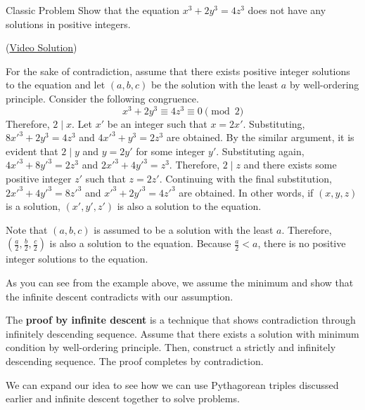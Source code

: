\documentclass[../../../main.tex]{subfiles}
\begin{document}
\begin{problem}{Classic Problem}{}
Show that the equation $x^3 + 2y^3 = 4z^3$ does not have any
solutions in positive integers.
\end{problem}
(\href{https://youtu.be/UJR56wT0NIM}{Video Solution})
\begin{solution}
For the sake of contradiction, assume that there exists positive
integer solutions to the equation and let $(a, b, c)$ be the
solution with the least $a$ by well-ordering principle.
Consider the following congruence.
\[
x^3 + 2y^3 \equiv 4z^3 \equiv 0 \pmod{2}
\]
Therefore, $2 \mid x$. Let $x'$ be an integer such that $x = 2x'$.
Substituting, $8x'^3 + 2y^3 = 4z^3$ and $4x'^3 + y^3 = 2z^3$ are
obtained. By the similar argument, it is evident that $2 \mid y$
and $y = 2y'$ for some integer $y'$. Substituting again,
$4x'^3 + 8y'^3 = 2z^3$ and $2x'^3 + 4y'^3 = z^3$. Therefore,
$2 \mid z$ and there exists some positive integer $z'$ such that
$z = 2z'$. Continuing with the final substitution,
$2x'^3 + 4y'^3 = 8z'^3$ and $x'^3 + 2y'^3 = 4z'^3$ are obtained.
In other words, if $(x, y, z)$ is a solution, $(x', y', z')$ is
also a solution to the equation.

Note that $(a, b, c)$ is assumed to be a solution with the least $a$.
Therefore, $(\frac{a}{2}, \frac{b}{2}, \frac{c}{2})$ is also a
solution to the equation. Because $\frac{a}{2} < a$, there is no
positive integer solutions to the equation.
\end{solution}

As you can see from the example above, we assume the minimum
and show that the infinite descent contradicts with our assumption.

\begin{definition}{}{}
The \textbf{proof by infinite descent} is a technique that shows
contradiction through infinitely descending sequence. Assume that
there exists a solution with minimum condition by well-ordering
principle. Then, construct a strictly and infinitely descending
sequence. The proof completes by contradiction.
\end{definition}

We can expand our idea to see how we can use Pythagorean triples
discussed earlier and infinite descent together to solve problems.
\end{document}
